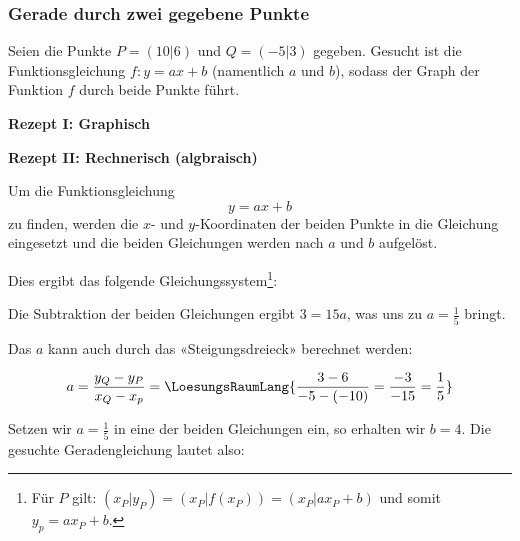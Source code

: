 
\subsubsection{Gerade durch zwei gegebene Punkte}

Seien die Punkte $P=(10|6)$ und $Q=(-5|3)$ gegeben.
Gesucht ist die Funktionsgleichung $f: y=ax+b$ (namentlich $a$ und $b$), sodass
der Graph der Funktion $f$ durch beide Punkte führt.


\textbf{Rezept I: Graphisch}\\

\vspace{1mm}



\textbf{Rezept II: Rechnerisch (algbraisch)}\\

\vspace{1mm}

\begin{rezept}{}{}
Um die Funktionsgleichung $$y=ax+b$$ zu finden,
  werden die $x$- und $y$-Koordinaten der beiden Punkte in die Gleichung eingesetzt und die beiden Gleichungen werden nach $a$ und $b$ aufgelöst. 
\end{rezept}

\noTRAINER{\vspace{12mm}}

Dies ergibt das folgende Gleichungssystem\footnote{Für $P$ gilt: $(x_P|y_P)=(x_P|f(x_P))=(x_P|ax_P+b)$ und somit $y_p =ax_P + b$.}:


Die Subtraktion der beiden Gleichungen ergibt $3 = 15a$, was uns zu $a=\frac{1}{5}$ bringt.

Das $a$ kann auch durch das «Steigungsdreieck» berechnet werden:

$$a = \frac{y_Q-y_P}{x_Q-x_p} = \LoesungsRaumLang{\frac{3 - 6}{-5 - (-10)} = \frac{-3}{-15} = \frac{1}{5}}$$

Setzen wir $a=\frac{1}{5}$ in eine der beiden Gleichungen ein, so erhalten wir $b=4$. Die gesuchte Geradengleichung lautet also:

